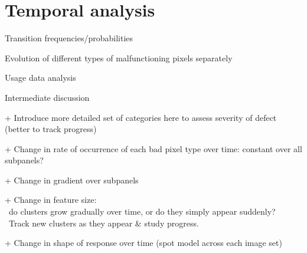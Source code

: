 \documentclass[\main/IO-Pixels.tex]{subfiles}
\begin{document}
\section{Temporal analysis}
\begin{outline}

Transition frequencies/probabilities

Evolution of different types of malfunctioning pixels separately

Usage data analysis

Intermediate discussion

+ Introduce more detailed set of categories here to assess severity of defect (better to track progress)

+ Change in rate of occurrence of each bad pixel type over time: constant over all subpanels?

+ Change in gradient over subpanels

+ Change in feature size: \\ \-\ do clusters grow gradually over time, or do they simply appear suddenly?\\ \-\ Track new clusters as they appear \& study progress.

+ Change in shape of response over time (spot model across each image set)
\end{outline}
\end{document}
